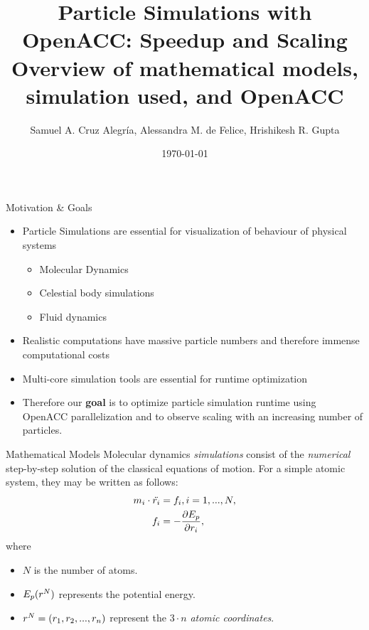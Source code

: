 \documentclass[aspectratio=169]{beamer}
\title[Particle Simulations with OpenACC]{\textbf{Particle Simulations with OpenACC: Speedup and Scaling}\\[0.5em] Overview of mathematical models, simulation used, and OpenACC}
\author{Samuel A. Cruz Alegr\'{i}a, Alessandra M. de Felice, Hrishikesh R. Gupta}
\institute{(University of Lugano)}
\date{\today}
\begin{document}
\begin{frame}
\titlepage
\end{frame}

\begin{frame}[fragile]{Motivation \& Goals}

\begin{itemize}
\item Particle Simulations are essential for visualization of behaviour of physical systems 
\begin{itemize}
\item Molecular Dynamics
\item Celestial body simulations
\item Fluid dynamics 
\end{itemize}
\item Realistic computations have massive particle numbers and therefore immense computational costs
\item Multi-core simulation tools are essential for runtime optimization
\item Therefore our \textbf{goal} is to optimize particle simulation runtime using OpenACC parallelization and to observe scaling with an increasing number of particles.
\end{itemize}


\end{frame}
\begin{frame}[fragile]{Mathematical Models}
Molecular dynamics \emph{simulations} consist of the \emph{numerical} step-by-step solution of the classical equations of motion. For a simple atomic system, they may be written as follows:
%
\begin{equation}
	\begin{split}
	m_i \cdot \ddot{\*r_i} &= \*f_i, i = 1,...,N,\\
	f_i &= -\frac{\partial E_p}{\partial \*r_i},
	\end{split}
\end{equation}
%
where
%
\begin{itemize}
	\item $N$ is the number of atoms.
	\item $E_p(\*r^N)$ represents the potential energy.
	\item $\*r^N = (\*r_1, \*r_2, ..., \*r_n)$ represent the $3 \cdot n$ \emph{atomic coordinates}.
\end{itemize}
%

\end{frame}
\end{document}

